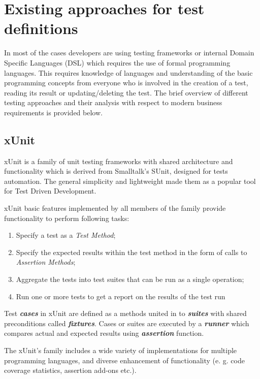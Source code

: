 \section{Existing approaches for test definitions}
\label{sec:testApproaches}
In most of the cases developers are using testing frameworks or internal Domain Specific Languages (DSL) which requires the use of formal programming languages. This requires knowledge of languages and understanding of the basic programming concepts from everyone who is involved in the creation of a test, reading its result or updating/deleting the test.
The brief overview of different testing approaches and their analysis with respect to modern business requirements is provided below.

\subsection{xUnit}
xUnit is a family of unit testing frameworks with shared architecture and functionality which is derived from Smalltalk's SUnit, designed for tests automation\cite{xunit}\cite{xunitFowler}. The general simplicity and lightweight made them as a popular tool for Test Driven Development\cite{xunitFowler}.

xUnit basic features implemented by all members of the family provide functionality to perform following tasks\cite{xunit}:
\begin{enumerate}
	\item Specify a test as a \textit{Test Method};
	\item Specify the expected results within the test method in the form of calls to \textit{Assertion Methods};
	\item Aggregate the tests into test suites that can be run as a single operation;
	\item Run one or more tests to get a report on the results of the test run
\end{enumerate}

Test \textbf{\textit{cases}} in xUnit are defined as a methods united in to \textbf{\textit{suites}} with shared preconditions called \textbf{\textit{fixtures}}.  Cases or suites are executed by a \textbf{\textit{runner}} which compares actual and expected results using \textbf{\textit{assertion}} function.

The xUnit's family includes a wide variety of implementations for multiple programming languages, and diverse enhancement of functionality (e. g. code coverage statistics, assertion add-ons etc.)\cite{xunitWiki}.

